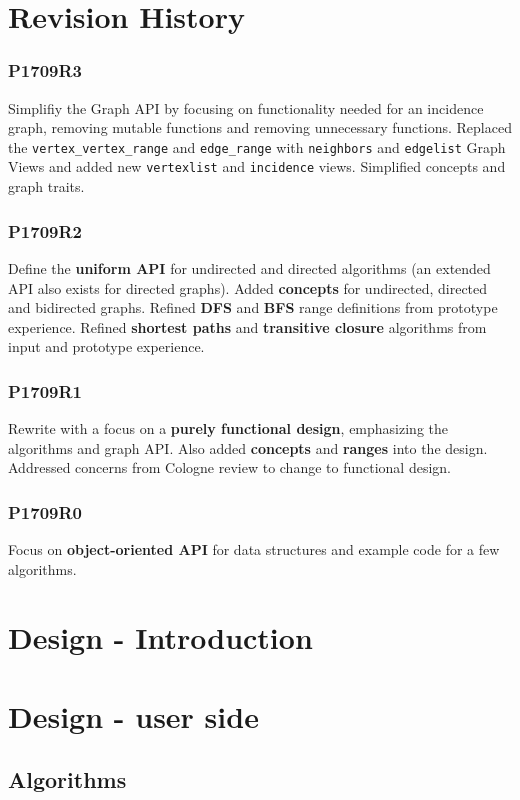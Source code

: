 \documentclass[10pt,onecolumn]{article}
\begin{document}
\section{Revision History}
\subsubsection*{P1709R3}
Simplifiy the Graph API by focusing on functionality needed for an incidence graph, removing mutable functions and removing unnecessary functions. Replaced the \texttt{vertex\_vertex\_range} and \texttt{edge\_range} with \texttt{neighbors} and \texttt{edgelist} Graph Views and added new \texttt{vertexlist} and \texttt{incidence} views. Simplified concepts and graph traits.

\subsubsection*{P1709R2}
Define the \textbf{uniform API} for undirected and directed algorithms (an extended API also exists for directed graphs). Added \textbf{concepts} for undirected, directed and bidirected graphs. Refined \textbf{DFS} and \textbf{BFS} range definitions from prototype experience. Refined \textbf{shortest paths} and \textbf{transitive closure} algorithms from input and prototype experience.

\subsubsection*{P1709R1}
Rewrite with a focus on a \textbf{purely functional design}, emphasizing the algorithms and graph API. Also added \textbf{concepts} and \textbf{ranges} into the design. Addressed concerns from Cologne review to change to functional design.

\subsubsection*{P1709R0}
Focus on \textbf{object-oriented API} for data structures and example code for a few algorithms.

\section{Design - Introduction}
\section{Design - user side}
\subsection{Algorithms}
\end{document}
